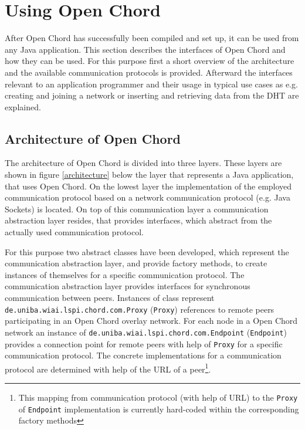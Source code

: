 \section{Using Open Chord}\label{usage}
After Open Chord has successfully been compiled and set up, it can be used from 
any Java application. This section describes the interfaces of Open Chord and how they 
can be used. For this purpose first a short overview of the architecture and the 
available communication protocols is provided. Afterward the interfaces relevant to 
an application programmer and their usage in typical use cases as e.g. creating and 
joining a network or inserting and retrieving data from the DHT are explained. 

\subsection{Architecture of Open Chord}
The architecture of Open Chord is divided into three layers. These layers are shown 
in figure \ref{architecture} below the layer that represents a Java application, that 
uses Open Chord. 
On the lowest layer the implementation of the employed communication 
protocol based on a network communication protocol (e.g. Java Sockets) is located. On 
top of this communication layer a communication abstraction layer resides, 
that provides interfaces, which abstract from the actually used 
communication protocol. 


For this purpose two abstract classes have been developed, which represent the 
communication abstraction layer, and provide factory methods, to create instances of themselves for a specific communication protocol. The 
communication abstraction layer provides interfaces for synchronous communication 
between peers. Instances of class represent {\tt de.uniba.wiai.lspi.chord.com.Proxy} 
({\tt Proxy}) references to remote peers participating in an Open Chord overlay 
network. For each node in a Open Chord network an instance of 
{\tt de.uniba.wiai.lspi.chord.com.Endpoint} ({\tt Endpoint}) provides a connection 
point for remote peers with help of {\tt Proxy} for a 
specific communication protocol. The concrete implementations for a communication protocol are determined with help of the URL of a peer\footnote{This mapping from 
communication protocol (with help of URL) to the {\tt Proxy} of {\tt Endpoint} 
implementation is currently hard-coded within the corresponding factory methods}. 

